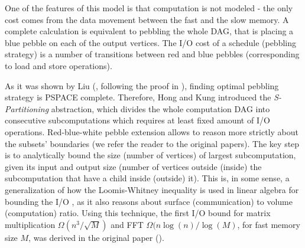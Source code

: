 \documentclass[sigconf]{acmart}
\begin{document}
	One of the features of this model is that computation is not modeled - the 
	only 
	cost comes from the data movement between the fast and the slow memory. A 
	complete calculation is equivalent to pebbling the whole DAG, that is 
	placing a blue pebble on each of the output vertices. The I/O cost of a 
	schedule (pebbling strategy) is a number of transitions between red and 
	blue pebbles (corresponding to load and store operations).
	
	As it was shown by Liu (\cite{redbluecomplete}, following the proof in 
	\cite{pebblegameregister}), finding optimal pebbling strategy is PSPACE 
	complete. Therefore, Hong and Kung introduced the \textit{S-Partitioning} 
	abstraction, which 
	divides the whole computation DAG into consecutive subcomputations which 
	requires at least fixed amount of I/O operations. Red-blue-white pebble 
	extension allows to reason more strictly about the subsets' boundaries 
	(we refer the reader to the original papers). The key step is to 
	analytically bound the size (number of vertices) of largest subcomputation, 
	given its input and output size (number of vertices outside (inside) the 
	subcomputation that have a child inside (outside) it). This is, in some 
	sense, a generalization of how the Loomis-Whitney inequality 
	\cite{loomisWhitney} is used in linear algebra for bounding the I/O 
	\cite{loomisApplied}, as it also reasons about surface (communication) to 
	volume (computation) ratio. Using this technique, the first I/O bound for 
	matrix multiplication $\Omega(n^3/\sqrt{M})$ and FFT $\Omega(n 
	\log(n)/\log(M)$, for fast memory size $M$, was derived in the original 
	paper (\cite{redblue}).
%	
\end{document}
